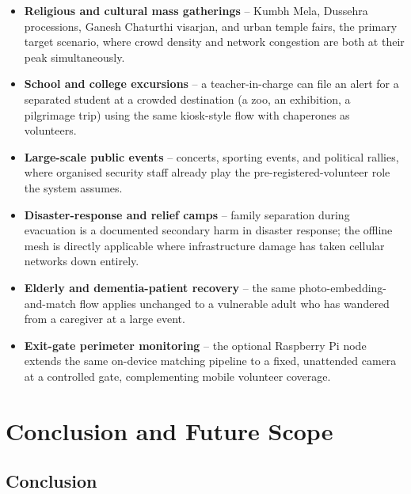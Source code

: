 \documentclass[12pt,a4paper,oneside]{report}
\begin{document}
\begin{itemize}
  \item \textbf{Religious and cultural mass gatherings} -- Kumbh Mela,
        Dussehra processions, Ganesh Chaturthi visarjan, and urban temple
        fairs, the primary target scenario, where crowd density and network
        congestion are both at their peak simultaneously.
  \item \textbf{School and college excursions} -- a teacher-in-charge can
        file an alert for a separated student at a crowded destination
        (a zoo, an exhibition, a pilgrimage trip) using the same kiosk-style
        flow with chaperones as volunteers.
  \item \textbf{Large-scale public events} -- concerts, sporting events, and
        political rallies, where organised security staff already play the
        pre-registered-volunteer role the system assumes.
  \item \textbf{Disaster-response and relief camps} -- family separation
        during evacuation is a documented secondary harm in disaster
        response; the offline mesh is directly applicable where
        infrastructure damage has taken cellular networks down entirely.
  \item \textbf{Elderly and dementia-patient recovery} -- the same
        photo-embedding-and-match flow applies unchanged to a vulnerable
        adult who has wandered from a caregiver at a large event.
  \item \textbf{Exit-gate perimeter monitoring} -- the optional Raspberry Pi
        node extends the same on-device matching pipeline to a fixed,
        unattended camera at a controlled gate, complementing mobile
        volunteer coverage.
\end{itemize}

\chapter{Conclusion and Future Scope}

\section{Conclusion}
\end{document}
